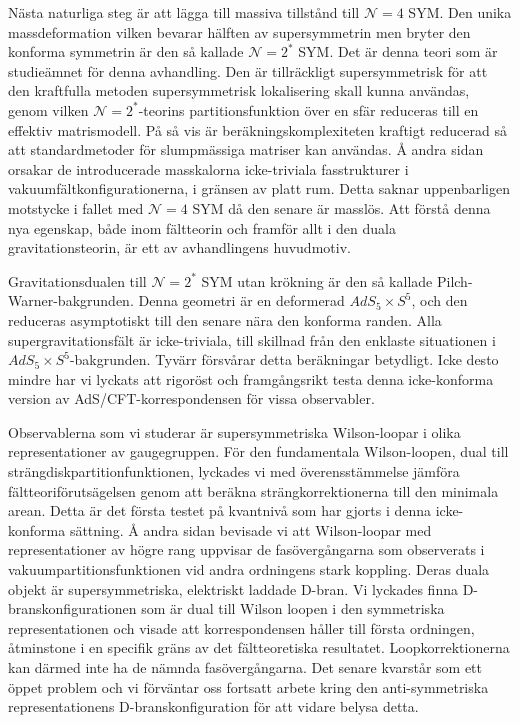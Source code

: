  
N\"asta naturliga steg \"ar att l\"agga till massiva tillst\r{a}nd till $\mathcal{N}=4$ SYM. Den unika massdeformation vilken bevarar h\"alften av supersymmetrin men bryter den konforma symmetrin \"ar den s\r{a} kallade $\mathcal{N}=2^*$ SYM. Det \"ar denna teori som \"ar studie\"amnet f\"or denna avhandling. Den \"ar tillr\"ackligt supersymmetrisk f\"or att den kraftfulla metoden supersymmetrisk lokalisering skall kunna anv\"andas, genom vilken $\mathcal{N}=2^*$-teorins partitionsfunktion \"over en sf\"ar reduceras till en effektiv matrismodell. P\r{a} s\r{a} vis \"ar ber\"akningskomplexiteten kraftigt reducerad s\r{a} att standardmetoder f\"or slumpm\"assiga matriser kan anv\"andas. \r{A} andra sidan orsakar de introducerade masskalorna icke-triviala fasstrukturer i vakuumf\"altkonfigurationerna, i gr\"ansen av platt rum. Detta saknar uppenbarligen motstycke i fallet med $\mathcal{N}=4$ SYM d\r{a} den senare \"ar massl\"os. Att f\"orst\r{a} denna nya egenskap, b\r{a}de inom f\"altteorin och framf\"or allt i den duala gravitationsteorin, \"ar ett av avhandlingens huvudmotiv.
 
Gravitationsdualen till $\mathcal{N}=2^*$ SYM utan kr\"okning \"ar den s\r{a} kallade Pilch-Warner-bakgrunden. Denna geometri \"ar en deformerad $AdS_5 \times S^5$, och den reduceras asymptotiskt till den senare n\"ara den konforma randen. Alla supergravitationsf\"alt \"ar icke-triviala, till skillnad fr\r{a}n den enklaste situationen i $AdS_5 \times S^5$-bakgrunden. Tyv\"arr f\"orsv\r{a}rar detta ber\"akningar betydligt. Icke desto mindre har vi lyckats att rigor\"ost och framg\r{a}ngsrikt testa denna icke-konforma version av AdS/CFT-korrespondensen f\"or vissa observabler.
 
Observablerna som vi studerar \"ar supersymmetriska Wilson-loopar i olika representationer av gaugegruppen. F\"or den fundamentala Wilson-loopen, dual till str\"angdiskpartitionfunktionen, lyckades vi med \"overensst\"ammelse j\"amf\"ora f\"altteorif\"oruts\"agelsen genom att ber\"akna str\"angkorrektionerna till den minimala arean. Detta \"ar det f\"orsta testet p\r{a} kvantniv\r{a} som har gjorts i denna icke-konforma s\"attning. \r{A} andra sidan bevisade vi att Wilson-loopar med representationer av h\"ogre rang uppvisar de fas\"overg\r{a}ngarna som observerats i vakuumpartitionsfunktionen vid andra ordningens stark koppling. Deras duala objekt \"ar supersymmetriska, elektriskt laddade D-bran. Vi lyckades finna D-branskonfigurationen som \"ar dual till Wilson loopen i den symmetriska representationen och visade att korrespondensen h\r{a}ller till f\"orsta ordningen, \r{a}tminstone i en specifik gr\"ans av det f\"altteoretiska resultatet. Loopkorrektionerna kan d\"armed inte ha de n\"amnda fas\"overg\r{a}ngarna. Det senare kvarst\r{a}r som ett \"oppet problem och vi f\"orv\"antar oss fortsatt arbete kring den anti-symmetriska representationens D-branskonfiguration f\"or att vidare belysa detta.

